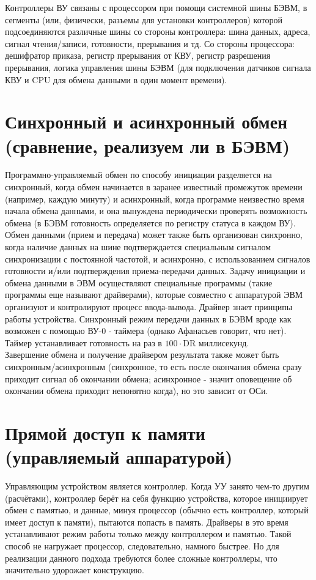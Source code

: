 \noindent Контроллеры ВУ связаны с процессором при помощи системной шины БЭВМ, в сегменты (или, физически, разъемы для установки контроллеров) которой подсоединяются различные шины со стороны контроллера: шина данных, адреса, сигнал чтения/записи, готовности, прерывания и тд. Со стороны процессора: дешифратор приказа, регистр прерывания от КВУ, регистр разрешения прерывания, логика управления шины БЭВМ (для подключения датчиков сигнала КВУ и CPU для обмена данными в один момент времени). 

\section{Синхронный и асинхронный обмен (сравнение, реализуем ли в БЭВМ)}
Программно-управляемый обмен по способу инициации разделяется на синхронный, когда обмен начинается в заранее известный промежуток времени (например, каждую минуту) и асинхронный, когда программе неизвестно время начала обмена данными, и она вынуждена периодически проверять возможность обмена (в БЭВМ готовность определяется по регистру статуса в каждом ВУ). \\
Обмен данными (прием и передача) может также быть организован синхронно, когда наличие данных на шине подтверждается специальным сигналом синхронизации с постоянной частотой, и асинхронно, с использованием сигналов готовности и/или подтверждения приема-передачи данных. Задачу инициации и обмена данными в ЭВМ осуществляют специальные программы (такие программы еще называют драйверами), которые совместно с аппаратурой ЭВМ организуют и контролируют процесс ввода-вывода. Драйвер знает принципы работы устройства. Синхронный режим передачи данных в БЭВМ вроде как возможен с помощью ВУ-0 - таймера (однако Афанасьев говорит, что нет). Таймер устанавливает готовность на раз в $100\cdot$DR миллисекунд. \\
Завершение обмена и получение драйвером результата также может быть синхронным/асинхронным (синхронное, то есть после окончания обмена сразу приходит сигнал об окончании обмена; асинхронное - значит оповещение об окончании обмена приходит непонятно когда), но это зависит от ОСи.

\section{Прямой доступ к памяти (управляемый аппаратурой)}
Управляющим устройством является контроллер. Когда УУ занято чем-то другим (расчётами), контроллер берёт на себя функцию устройства, которое инициирует обмен с памятью, и данные, минуя процессор (обычно есть контроллер, который имеет доступ к памяти), пытаются попасть в память. Драйверы в это время устанавливают режим работы только между контроллером и памятью.  Такой способ не нагружает процессор, следовательно, намного быстрее. Но для реализации данного подхода требуются более сложные контроллеры, что значительно удорожает конструкцию.

